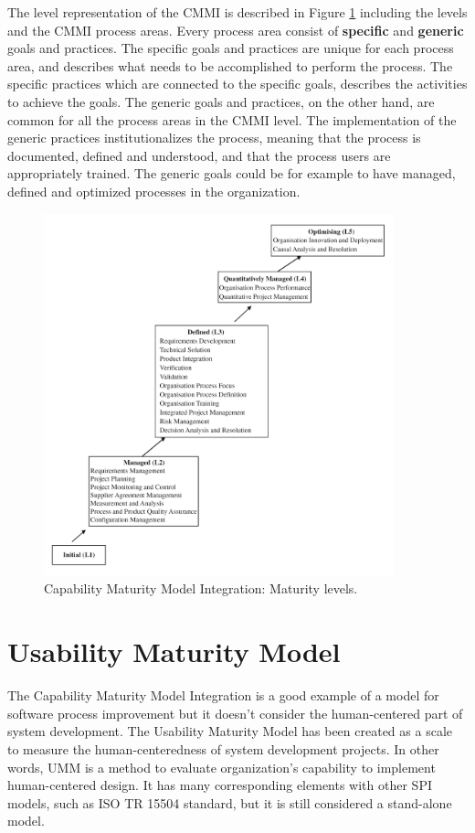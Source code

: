 \documentclass[12pt,a4paper,oneside,pdftex]{report}
\begin{document}
The level representation of the CMMI is described in Figure \ref{fig:cmmi} including the levels and the CMMI process areas. Every process area consist of \textbf{specific} and \textbf{generic} goals and practices. The specific goals and practices are unique for each process area, and describes what needs to be accomplished to perform the process. The specific practices which are connected to the specific goals, describes the activities to achieve the goals. The generic goals and practices, on the other hand, are common for all the process areas in the CMMI level. The implementation of the generic practices institutionalizes the process, meaning that the process is documented, defined and understood, and that the process users are appropriately trained. The generic goals could be for example to have managed, defined and optimized processes in the organization. \cite{RefWorks:29}	

\begin{figure}[H]
  	\centering
  	\includegraphics[width=0.9\textwidth]{./images/cmmi_levels.png}
  	\caption{Capability Maturity Model Integration: Maturity levels. \cite{RefWorks:29}}
	\label{fig:cmmi}
\end{figure}



\section{Usability Maturity Model}
The Capability Maturity Model Integration is a good example of a model for software process improvement but it doesn't consider the human-centered part of system development. The Usability Maturity Model has been created as a scale to measure the human-centeredness of system development projects. In other words, UMM is a method to evaluate organization's capability to implement human-centered design. It has many corresponding elements with other SPI models, such as ISO TR 15504 standard, but it is still considered a stand-alone model. \cite{RefWorks:30}
\end{document}
